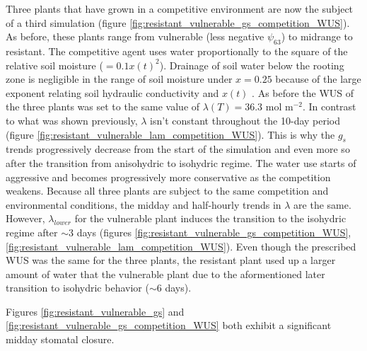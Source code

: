 \documentclass[utf8]{frontiersSCNS} %
\begin{document}
Three plants that have grown in a competitive environment are now the subject of a third simulation (figure \ref{fig:resistant_vulnerable_gs_competition_WUS}). As before, these plants range from vulnerable (less negative $\psi_{63}$) to midrange to resistant. The competitive agent uses water proportionally to the square of the relative soil moisture ($=0.1 x(t)^2$). Drainage of soil water below the rooting zone is negligible in the range of soil moisture under $x=0.25$ because of the large exponent relating soil hydraulic conductivity and $x(t)$ \citep{campbell1974}. As before the WUS of the three plants was set to the same value of $\lambda(T)=36.3$ mol m$^{-2}$. In contrast to what was shown previously, $\lambda$ isn't constant throughout the 10-day period (figure \ref{fig:resistant_vulnerable_lam_competition_WUS}). This is why the $g_s$ trends progressively decrease from the start of the simulation and even more so after the transition from anisohydric to isohydric regime. The water use starts of aggressive and becomes progressively more conservative as the competition weakens. Because all three plants are subject to the same competition and environmental conditions, the midday and half-hourly trends in $\lambda$ are the same. However, $\lambda_{lower}$ for the vulnerable plant induces the transition to the isohydric regime after $\sim 3$ days (figures \ref{fig:resistant_vulnerable_gs_competition_WUS}, \ref{fig:resistant_vulnerable_lam_competition_WUS}). Even though the prescribed WUS was the same for the three plants, the resistant plant used up a larger amount of water that the vulnerable plant due to the aformentioned later transition to isohydric behavior ($\sim 6$ days).

Figures \ref{fig:resistant_vulnerable_gs} and \ref{fig:resistant_vulnerable_gs_competition_WUS} both exhibit a significant midday stomatal closure. 

\end{document}
